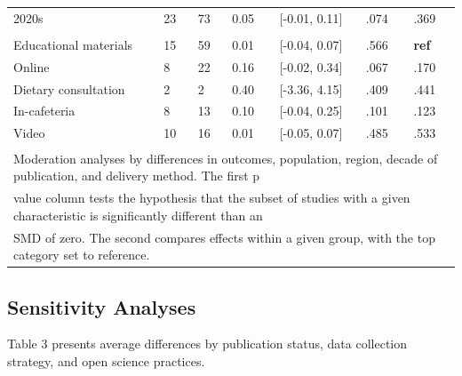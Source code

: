\documentclass[sn-nature,referee,pdflatex]{sn-jnl}
\begin{document}
\begin{table}[!ht]
\begin{tabular}[t]{lllllll}
\hspace{1em}2020s & 23 & 73 & 0.05 & {}[-0.01, 0.11] & .074 & .369\\
\addlinespace[0.3em]
\multicolumn{7}{l}{\textbf{Method of Delivery}}\\
\hspace{1em}Educational materials & 15 & 59 & 0.01 & {}[-0.04, 0.07] & .566 & \textbf{ref}\\
\hspace{1em}Online & 8 & 22 & 0.16 & {}[-0.02, 0.34] & .067 & .170\\
\hspace{1em}Dietary consultation & 2 & 2 & 0.40 & {}[-3.36, 4.15] & .409 & .441\\
\hspace{1em}In-cafeteria & 8 & 13 & 0.10 & {}[-0.04, 0.25] & .101 & .123\\
\hspace{1em}Video & 10 & 16 & 0.01 & {}[-0.05, 0.07] & .485 & .533\\
\bottomrule
\multicolumn{7}{l}{\textsuperscript{} Moderation analyses by differences in outcomes, population, region, decade of publication, and delivery method. The first p}\\
\multicolumn{7}{l}{value column tests the hypothesis that the subset of studies with a given characteristic is significantly different than an}\\
\multicolumn{7}{l}{SMD of zero. The second compares effects within a given group, with the top category set to reference.}\\
\end{tabular}
\end{table}

\subsection{Sensitivity Analyses}\label{sec2.5}

Table 3 presents average differences by publication status, data
collection strategy, and open science practices.
\end{document}

